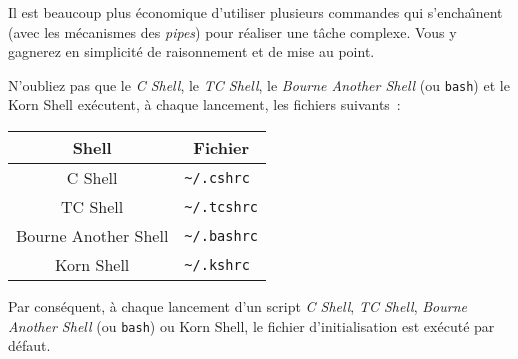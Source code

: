 Il est beaucoup plus {\'e}conomique d'utiliser plusieurs commandes qui s'encha{\^\i}nent (avec les 
m{\'e}canismes des {\sl pipes}) pour r{\'e}aliser une t{\^a}che complexe. Vous y gagnerez en simplicit{\'e} de 
raisonnement et de mise au point.

N'oubliez pas que le {\sl C Shell}, le {\sl TC Shell}, le {\sl Bourne Another
Shell} (ou {\tt bash}) et le Korn Shell ex{\'e}cutent, {\`a} chaque lancement, les
fichiers suivants~:

\begin{tabular}{|c|l|}
	\hline
	Shell						&	\multicolumn{1}{|c|}{Fichier}	\\
	\hline \hline
	C Shell						&	\verb=~/.cshrc=					\\
	TC Shell					&	\verb=~/.tcshrc=				\\
	Bourne Another Shell		&	\verb=~/.bashrc=				\\
	Korn Shell					&	\verb=~/.kshrc=					\\
	\hline
\end{tabular}

Par cons{\'e}quent, {\`a} chaque lancement d'un script {\sl C Shell}, {\sl TC Shell}, {\sl Bourne Another
Shell} (ou {\tt bash}) ou Korn Shell, le fichier d'initialisation est 
ex{\'e}cut{\'e} par d{\'e}faut.

